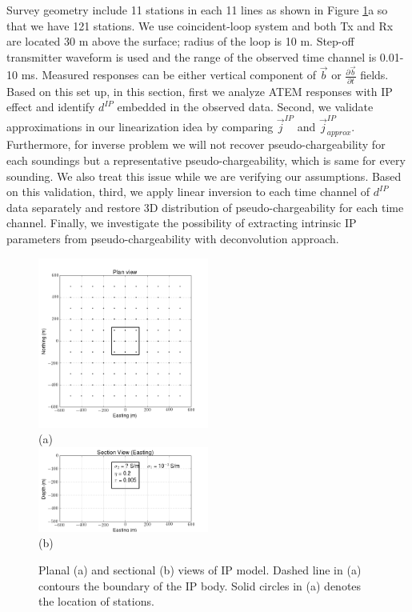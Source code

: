 \documentclass[a4paper, 11pt]{article}
\renewcommand {\j}  { {\vec j} }
\renewcommand {\b}  { {\vec b} }
\newcommand{\dip}{d^{IP}}
\begin{document}
Survey geometry include 11 stations in each 11 lines as shown in Figure \ref{F: IPModel}a so that we have 121 stations. We use coincident-loop system and both Tx and Rx are located 30 m above the surface; radius of the loop is 10 m. Step-off transmitter waveform is used and the range of the observed time channel is 0.01-10 ms. Measured responses can be either vertical component of $\b$ or $\frac{\partial \b}{\partial t}$ fields. Based on this set up, in this section, first we analyze ATEM responses with IP effect and identify $d^{IP}$ embedded in the observed data. Second, we validate approximations in our linearization idea by comparing $\j^{IP}$ and $\j^{IP}_{approx}$. Furthermore, for inverse problem we will not recover pseudo-chargeability for each soundings but a representative pseudo-chargeability, which is same for every sounding. We also treat this issue while we are verifying our assumptions. 
Based on this validation, third, we apply linear inversion to each time channel of $\dip$ data separately and restore 3D distribution of pseudo-chargeability for each time channel. Finally, we investigate the possibility of extracting intrinsic IP parameters from pseudo-chargeability with deconvolution approach. 

\begin{figure}[htb]
  \centering
  \includegraphics[width=0.5\textwidth]{figures/threecasesresp/Planview.png} \\
  (a) \\
  \includegraphics[width=0.5\textwidth]{figures/threecasesresp/Sectionview.png} \\
  (b)
  \caption{Planal (a) and sectional (b) views of IP model. Dashed line in (a) contours the boundary of the IP body. Solid circles in (a) denotes the location of stations.}
  \label{F: IPModel}
\end{figure}
\clearpage
\end{document}
